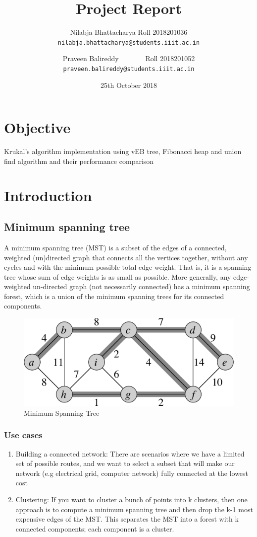 \documentclass{article}
\title{Project Report}
\author{
    Nilabja Bhattacharya { Roll 2018201036}\\
  \texttt{nilabja.bhattacharya@students.iiit.ac.in}
  \and
    Praveen Balireddy {\ \ \  \ \ \ \ Roll 2018201052}\\
  \texttt{praveen.balireddy@students.iiit.ac.in}
}
\date{25th October 2018}
\begin{document}
\maketitle

\section{Objective}
Krukal’s algorithm implementation using vEB tree, Fibonacci heap and union find algorithm and their performance comparison

\section{Introduction}

\subsection{Minimum spanning tree}
A minimum spanning tree (MST) is a subset of the edges of a connected, weighted (un)directed graph that connects all the vertices together, without any cycles and with the minimum possible total edge weight. That is, it is a spanning tree whose sum of edge weights is as small as possible. More generally, any edge-weighted un-directed graph (not necessarily connected) has a minimum spanning forest, which is a union of the minimum spanning trees for its connected components.

\begin{figure}[h!]
\centering
\includegraphics[width=0.7\columnwidth]{mst.jpg}
\caption{Minimum Spanning Tree}
\label{fig:MST}
\end{figure}


\subsubsection{Use cases}
\begin{enumerate}
\item Building a connected network: There are scenarios where we have a limited set of possible routes, and we want to select a subset that will make our network (e.g electrical grid, computer network) fully connected at the lowest cost
\item Clustering: If you want to cluster a bunch of points into k clusters, then one approach is to compute a minimum spanning tree and then drop the k-1 most expensive edges of the MST. This separates the MST into a forest with k connected components; each component is a cluster.
\end{enumerate}
\end{document}
